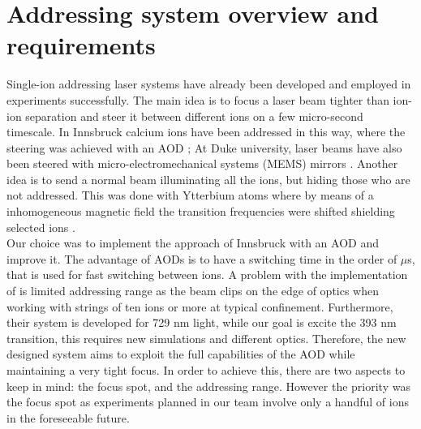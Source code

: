 \section{Addressing system overview and requirements}
\label{sec:addressing}
Single-ion addressing laser systems have already been developed and employed in experiments successfully. The main idea is to focus a laser beam tighter than ion-ion separation and steer it between different ions on a few micro-second timescale. In Innsbruck calcium ions have been addressed in this way, where the steering was achieved with an AOD \cite{addressing}; At Duke university, laser beams have also been steered with micro-electromechanical systems (MEMS) mirrors \cite{addressing3}. Another idea is to send a normal beam illuminating all the ions, but hiding those who are not addressed. This was done with Ytterbium atoms where by means of a inhomogeneous magnetic field the transition frequencies were shifted shielding selected ions \cite{addressing2}. \\
Our choice was to implement the approach of Innsbruck with an AOD and improve it. The advantage of AODs is to have a switching time in the order of $\mu$s, that is used for fast switching between ions. A problem with the implementation of \cite{addressing} is limited addressing range as the beam clips on the edge of optics when working with strings of ten ions or more at typical confinement. Furthermore, their system is developed for 729 nm light, while our goal is excite the 393 nm transition, this requires new simulations and different optics. Therefore, the new designed system aims to exploit the full capabilities of the AOD while maintaining a very tight focus. In order to achieve this, there are two aspects to keep in mind: the focus spot, and the addressing range. However the priority was the focus spot as experiments planned in our team involve only a handful of ions in the foreseeable future.
